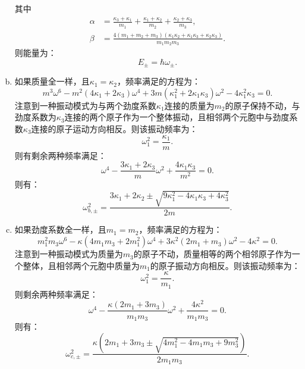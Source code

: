 \documentclass[reqno,a4paper,12pt]{amsart}
\begin{document}
\begin{tcolorbox}[breakable, colback = black!5!white, colframe = black]
\begin{enumerate}[(a)]
\[\]
其中
\begin{align*}
	\alpha &= \frac{\kappa_3+\kappa_1}{m_1} + \frac{\kappa_1+\kappa_2}{m_2} + \frac{\kappa_2+\kappa_3}{m_3}, \\
	\beta &= \frac{4(m_1+m_2+m_3)(\kappa_1\kappa_2+\kappa_1\kappa_3+\kappa_2\kappa_3)}{m_1m_2m_3}.
\end{align*}
则能量为：
\[
	E_{\pm} = \hbar\omega_{\pm}.
\]

\item 如果质量全一样，且$\kappa_1 = \kappa_2$，频率满足的方程为：
\[
	m^3\omega^6 - m^2(4\kappa_1+2\kappa_3)\omega^4 + 3m(\kappa_1^2+2\kappa_1\kappa_3)\omega^2 - 4\kappa_1^2\kappa_3 = 0.
\]
注意到一种振动模式为与两个劲度系数$\kappa_1$连接的质量为$m_2$的原子保持不动，与劲度系数为$\kappa_3$连接的两个原子作为一个整体振动，且相邻两个元胞中与劲度系数$\kappa_3$连接的原子运动方向相反。则该振动频率为：
\[
	\omega_1^2 = \frac{\kappa_1}{m}.
\]
则有剩余两种频率满足：
\[
	\omega^4 - \frac{3\kappa_1+2\kappa_3}{m}\omega^2 + \frac{4\kappa_1\kappa_3}{m^2} = 0.
\]
则有：
\[
	\omega^2_{b,\pm} = \frac{3\kappa_1+2\kappa_2 \pm \sqrt{9\kappa_1^2 - 4\kappa_1\kappa_3 + 4\kappa_3^2}}{2m}.
\]

\item 如果劲度系数全一样，且$m_1=m_2$，频率满足的方程为：
\[
	m_1^2m_3\omega^6 - \kappa (4m_1m_3+2m_1^2) \omega^4 + 3\kappa^2(2m_1+m_3)\omega^2 - 4\kappa^2 = 0.
\]
注意到一种振动模式为质量为$m_3$的原子不动，质量相等的两个相邻原子作为一个整体，且相邻两个元胞中质量为$m_1$的原子振动方向相反。则该振动频率为：
\[
	\omega_1^2 = \frac{\kappa}{m_1}.
\]
则剩余两种频率满足：
\[
	\omega^4 - \frac{\kappa(2m_1+3m_3)}{m_1m_3}\omega^2 + \frac{4\kappa^2}{m_1m_3} = 0.
\]
则有：
\[
	\omega_{c,\pm}^2 = \frac{\kappa(2m_1+3m_3 \pm \sqrt{4m_1^2-4m_1m_3 + 9m_3^2})}{2m_1m_3}.
\]
\end{enumerate}
\end{tcolorbox}
\end{document}
